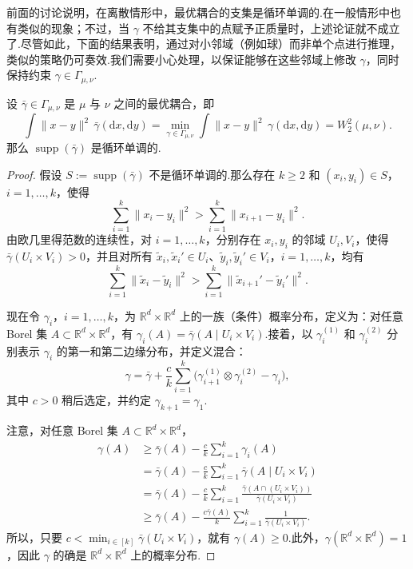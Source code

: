 前面的讨论说明，在离散情形中，最优耦合的支集是循环单调的.在一般情形中也有类似的现象；不过，当 $\gamma$ 不给其支集中的点赋予正质量时，上述论证就不成立了.尽管如此，下面的结果表明，通过对小邻域（例如球）而非单个点进行推理，类似的策略仍可奏效.我们需要小心处理，以保证能够在这些邻域上修改 $\gamma$，同时保持约束 $\gamma\in\Gamma_{\mu,\nu}$.

\begin{proposition}\label{prop:1.11}
设 $\bar\gamma\in\Gamma_{\mu,\nu}$ 是 $\mu$ 与 $\nu$ 之间的最优耦合，即
$$
\int\|x-y\|^2\,\bar\gamma(\mathrm dx,\mathrm dy)
=\min_{\gamma\in\Gamma_{\mu,\nu}}\int\|x-y\|^2\,\gamma(\mathrm dx,\mathrm dy)
=W_2^2(\mu,\nu).
$$
那么 $\operatorname{supp}(\bar\gamma)$ 是循环单调的.
\end{proposition}

\begin{proof}
假设 $S:=\operatorname{supp}(\bar\gamma)$ 不是循环单调的.那么存在 $k\ge2$ 和 $(x_i,y_i)\in S$，$i=1,\ldots,k$，使得
$$
\sum_{i=1}^k\|x_i-y_i\|^2>\sum_{i=1}^k\|x_{i+1}-y_i\|^2.
$$
由欧几里得范数的连续性，对 $i=1,\ldots,k$，分别存在 $x_i,y_i$ 的邻域 $U_i,V_i$，使得 $\bar\gamma(U_i\times V_i)>0$，并且对所有 $\tilde x_i,\tilde x_i'\in U_i$、$\tilde y_i,\tilde y_i'\in V_i$，$i=1,\ldots,k$，均有
\begin{equation}\label{eq:1.14}
\sum_{i=1}^k\|\tilde x_i-\tilde y_i\|^2
>\sum_{i=1}^k\|\tilde x_{i+1}'-\tilde y_i'\|^2.
\end{equation}

现在令 $\gamma_i$，$i=1,\ldots,k$，为 $\mathbb R^d\times\mathbb R^d$ 上的一族（条件）概率分布，定义为：对任意 Borel 集 $A\subset\mathbb R^d\times\mathbb R^d$，有 $\gamma_i(A)=\bar\gamma(A\mid U_i\times V_i)$.接着，以 $\gamma_i^{(1)}$ 和 $\gamma_i^{(2)}$ 分别表示 $\gamma_i$ 的第一和第二边缘分布，并定义混合：
$$
\gamma=\bar\gamma+\frac ck\sum_{i=1}^k
\bigl(\gamma_{i+1}^{(1)}\otimes\gamma_i^{(2)}-\gamma_i\bigr),
$$
其中 $c>0$ 稍后选定，并约定 $\gamma_{k+1}=\gamma_1$.

注意，对任意 Borel 集 $A\subset\mathbb R^d\times\mathbb R^d$，
$$
\begin{aligned}
\gamma(A)&\ge\bar\gamma(A)-\frac ck\sum_{i=1}^k\gamma_i(A)\\
&=\bar\gamma(A)-\frac ck\sum_{i=1}^k\bar\gamma(A\mid U_i\times V_i)\\
&=\bar\gamma(A)-\frac ck\sum_{i=1}^k
\frac{\bar\gamma(A\cap(U_i\times V_i))}{\bar\gamma(U_i\times V_i)}\\
&\ge\bar\gamma(A)-\frac{c\bar\gamma(A)}k\sum_{i=1}^k
\frac1{\bar\gamma(U_i\times V_i)}.
\end{aligned}
$$
所以，只要 $c<\min_{i\in[k]}\bar\gamma(U_i\times V_i)$，就有 $\gamma(A)\ge0$.此外，$\gamma(\mathbb R^d\times\mathbb R^d)=1$，因此 $\gamma$ 的确是 $\mathbb R^d\times\mathbb R^d$ 上的概率分布.


\end{proof}
